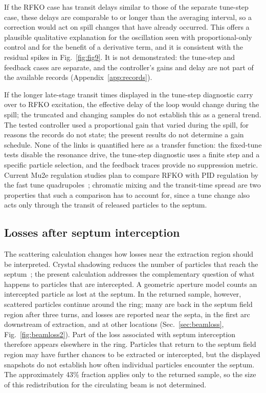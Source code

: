 \documentclass[a4paper,fleqn]{cas-sc}
\begin{document}
If the RFKO case has transit delays similar to those of the separate tune-step case, these delays are comparable to or longer than the averaging interval, so a correction would act on spill changes that have already occurred. This offers a plausible qualitative explanation for the oscillation seen with proportional-only control and for the benefit of a derivative term, and it is consistent with the residual spikes in Fig.~\ref{fig:fig9}. It is not demonstrated: the tune-step and feedback cases are separate, and the controller's gains and delay are not part of the available records (Appendix~\ref{app:records}).

If the longer late-stage transit times displayed in the tune-step diagnostic carry over to RFKO excitation, the effective delay of the loop would change during the spill; the truncated and changing samples do not establish this as a general trend. The tested controller used a proportional gain that varied during the spill, for reasons the records do not state; the present results do not determine a gain schedule. None of the links is quantified here as a transfer function: the fixed-tune tests disable the resonance drive, the tune-step diagnostic uses a finite step and a specific particle selection, and the feedback traces provide no suppression metric. Current Mu2e regulation studies plan to compare RFKO with PID regulation by the fast tune quadrupoles~\cite{srs2025}; chromatic mixing and the transit-time spread are two properties that such a comparison has to account for, since a tune change also acts only through the transit of released particles to the septum.

\subsection{\label{sec:lossdisc}Losses after septum interception}

The scattering calculation changes how losses near the extraction region should be interpreted. Crystal shadowing reduces the number of particles that reach the septum~\cite{velotti,crystal8gev}; the present calculation addresses the complementary question of what happens to particles that are intercepted. A geometric aperture model counts an intercepted particle as lost at the septum. In the returned sample, however, scattered particles continue around the ring; many are back in the septum field region after three turns, and losses are reported near the septa, in the first arc downstream of extraction, and at other locations (Sec.~\ref{sec:beamloss}, Fig.~\ref{fig:beamloss2}). Part of the loss associated with septum interception therefore appears elsewhere in the ring. Particles that return to the septum field region may have further chances to be extracted or intercepted, but the displayed snapshots do not establish how often individual particles encounter the septum. The approximately 43\% fraction applies only to the returned sample, so the size of this redistribution for the circulating beam is not determined.
\end{document}
